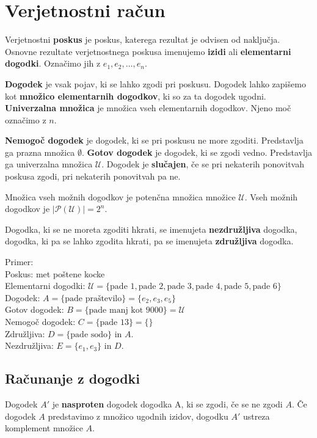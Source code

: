 \documentclass[a4paper,oneside,12pt,fleqn]{article}
\numberwithin{equation}{section}
\begin{document}
\section{Verjetnostni račun}
\label{sec:verj}
Verjetnostni \textbf{poskus} je poskus, katerega rezultat je odvisen od naključja.
Osnovne rezultate verjetnostnega poskusa imenujemo \textbf{izidi} ali \textbf{elementarni
dogodki}. Označimo jih z $e_1, e_2, \dots, e_n$.

\textbf{Dogodek} je vsak pojav, ki se lahko zgodi pri poskusu. Dogodek lahko zapišemo kot
\textbf{množico elementarnih dogodkov}, ki so za ta dogodek ugodni.
\textbf{Univerzalna množica} je množica vseh elementarnih dogodkov. Njeno moč označimo z
$n$.

\textbf{Nemogoč dogodek} je dogodek, ki se pri poskusu ne more zgoditi. Predstavlja ga prazna
množica $\emptyset$.
\textbf{Gotov dogodek} je dogodek, ki se zgodi vedno. Predstavlja ga univerzalna množica
$\mathcal U$.
Dogodek je \textbf{slučajen}, če se pri nekaterih ponovitvah poskusa zgodi, pri nekaterih
ponovitvah pa ne.

Množica vseh možnih dogodkov je potenčna množica množice $\mathcal U$. Vseh možnih
dogodkov je $|\mathcal P (\mathcal U)| = 2^n$.

Dogodka, ki se ne moreta zgoditi hkrati, se imenujeta \textbf{nezdružljiva} dogodka, dogodka, ki pa
se lahko zgodita hkrati, pa se imenujeta \textbf{združljiva} dogodka.

Primer:\\
Poskus: met poštene kocke\\
Elementarni dogodki: $\mathcal U = \{\text{pade 1}, \text{pade 2}, \text{pade 3},
\text{pade 4}, \text{pade 5}, \text{pade 6}\}$\\
Dogodek: $A = \{\text{pade praštevilo}\} = \{e_2, e_3, e_5\}$\\
Gotov dogodek: $B = \{\text{pade manj kot 9000}\} = \mathcal U$\\
Nemogoč dogodek: $C = \{\text{pade 13}\} = \{\}$ \\
Združljiva: $D = \{\text{pade sodo}\}$ in $A$. \\
Nezdružljiva: $E = \{e_1, e_3\}$ in $D$. \\

\subsection{Računanje z dogodki}
\label{sec:verj:racdog}
Dogodek $A'$ je \textbf{nasproten} dogodek dogodka A, ki se zgodi, če se ne zgodi $A$.
Če dogodek $A$ predstavimo z množico ugodnih izidov, dogodku $A'$ ustreza komplement
množice $A$.
\end{document}
